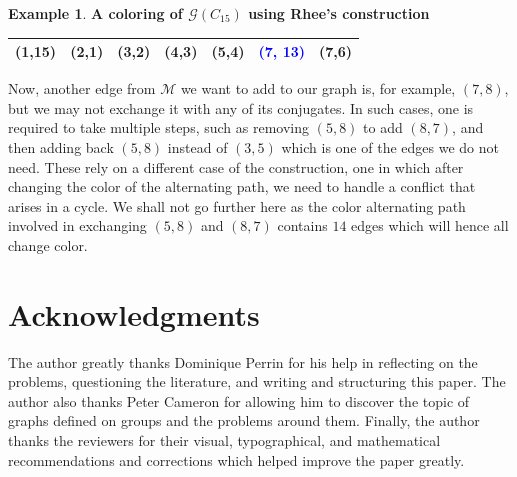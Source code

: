 \documentclass{article}
\theoremstyle{definition}
\newtheorem{example}[theorem]{Example}
\theoremstyle{indentclaim}
\theoremstyle{named}
\theoremstyle{named}
\begin{document}
\begin{example}{\textbf{A coloring of $\mathscr{G}(C_{15})$ using Rhee's construction}}
\begin{table}[H]
{\begin{tabular}[t]{|C|C|C|C|C|C|C|}
  (1,15)& (2,1)& (3,2)& (4,3)& (5,4) & \textcolor{blue}{(7, 13)} & (7,6) \\ \hline
\end{tabular} 

}
\end{table}

\medskip

Now, another edge from $\mathcal{M}$ we want to add to our graph is, for example, $(7, 8)$, but we may not exchange it with any of its conjugates. In such cases, one is required to take multiple steps, such as removing $(5, 8)$ to add $(8, 7)$, and then adding back $(5, 8)$ instead of $(3, 5)$ which is one of the edges we do not need. These rely on a different case of the construction, one in which after changing the color of the alternating path, we need to handle a conflict that arises in a cycle. We shall not go further here as the color alternating path involved in exchanging $(5, 8)$ and $(8, 7)$ contains $14$ edges which will hence all change color.  


\end{example}

\pagebreak

\section*{Acknowledgments}
The author greatly thanks Dominique Perrin for his help in reflecting on the problems, questioning the literature, and writing and structuring this paper. The author also thanks Peter Cameron for allowing him to discover the topic of graphs defined on groups and the problems around them. Finally, the author thanks the reviewers for their visual, typographical, and mathematical recommendations and corrections which helped improve the paper greatly. 


\printbibliography
\end{document}
